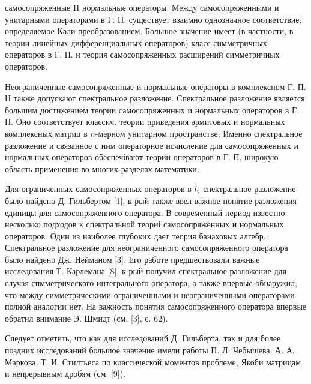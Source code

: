 \documentclass[10pt]{article}
\begin{document}
самосопряженные II нормальные операторы. Между самосопряженными и унитарными операторами в Г. П. существует взаимно однозначное соответствие, определяемое Кәли преобразованием. Большое значение имеет (в частности, в теории линейных дифференциальных операторов) класс симметричных операторов в Г. П. и теория самосопряженных расширений симметричных операторов.



Неограниченные самосопряженные и нормальные операторы в комплексном Г. П. $Н$ также допускают спектральное разложение. Спектральное разложение является большим достижением теории самосопряженных и нормальных операторов в $Г$. П. Оно соответствует классич. теории приведения әрмитовых и нормальных комплексных матриц в $n$-мерном унитарном пространстве. Именно спектральное разложение и связанное с ним операторное исчисление для самосопряженных и нормальных операторов обеспечівают теории операторов в Г. П. широкую область применения во многих разделах математики.



Для ограниченных самосопряженных операторов в $l_{2}$ спектральное разложение было найдено Д. Гильбертом [1], к-рый также ввел важное понятие разложения единицы для самосопряженного оператора. В современный период известно несколько подходов к спектральной теориі самосопряженных и нормальных операторов. Один из наиболее глубоких дает теория банаховых алгебр. Спектральное разложение для неограниченного самосопряженного оператора было найдено Дж. Нейманом [3]. Его работе предшествовали важные исследования Т. Карлемана [8], к-рый получил спектральное разложение для случая спмметрического интегрального оператора, а также впервые обнаружил, что между симметрическими ограниченными и неограниченными операторами полной аналогии нет. На важность понятия самосопряженного оператора впервые обратил внимание Э. Шмидт (см. [3], с. 62).



Следует отметить, что как для исследований Д. Гильберта, так и для более поздних исследований большое значение имели работы П. Л. Чебышева, А. А. Маркова, Т. И. Стилтьеса по классической моментов проблеме, Якоби матрицам и непрерывным дробям (см. [9]).
\end{document}
